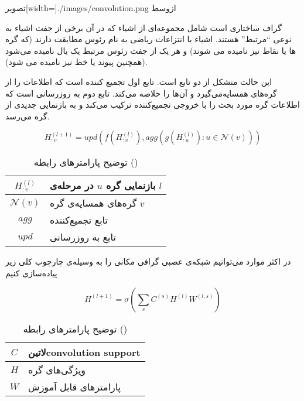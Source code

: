   ‌تصویر[width=\textwidth]{./images/convolution.png}
  ‌ازوسط

گراف ساختاری است شامل مجموعه‌ای از اشیاء که در آن برخی از جفت اشیاء به نوعی ``مرتبط'' هستند. اشیاء با انتزاعات ریاضی به نام رئوس مطابقت دارند (که گره ها یا نقاط نیز نامیده می شوند) و هر یک از جفت رئوس مرتبط یک یال نامیده می‌شود (همچنین پیوند یا خط نیز نامیده می شود).



این حالت متشکل از دو تابع است. تابع اول تجمیع کننده است که اطلاعات را از گره‌های همسایه‌می‌گیرد و آن‌ها را خلاصه می‌کند. تابع دوم به روزرسانی است که اطلاعات گره مورد بحث را با خروجی تجمیع‌کننده ترکیب می‌کند و به بازنمایی جدیدی از گره می‌رسد.

\begin{equation}
  \label{eq:spatial}
H_{:v}^{(l+1)}=upd(f(H_{:v}^{(l)}),agg(g(H_{:u}^{(l)}): u\in \mathcal{N}(v)))
\end{equation}

\begin{table}[h]
  \centering
  \caption{توضیح پارامترهای رابطه ()}
  \begin{tabular}{|c|p{}|}
    \hline
    $H_{:v}^{(l)}$ & بازنمایی گره $u$ در مرحله‌ی $l$ \\
    \hline
    $\mathcal{N}(v)$ & گره‌های همسایه‌ی گره $v$ \\
    \hline
    $agg$ & تابع تجمیع‌کننده \\
    \hline
    $upd$ & تابع به روزرسانی \\
    \hline
  \end{tabular}
  \label{tbl:distance}
\end{table}

در اکثر موارد می‌توانیم شبکه‌ی عصبی گرافی مکانی را به وسیله‌ی چارچوب کلی زیر پیاده‌سازی کنیم

\begin{equation}
  \label{eq:spatial_1}
H^{(l+1)}=\sigma(\sum_{s}C^{(s)}H^{(l)}W^{(l,s)})
\end{equation}

\begin{table}[h]
  \centering
  \caption{توضیح پارامترهای رابطه ()}
  \begin{tabular}{|c|p{}|}
    \hline
    $C$ & ‌لاتین{convolution support} \\
    \hline
    $H$ & ویژگی‌های گره \\
    \hline
    $W$ & پارامترهای قابل آموزش \\
    \hline
  \end{tabular}
  \label{tbl:distance}
\end{table}

